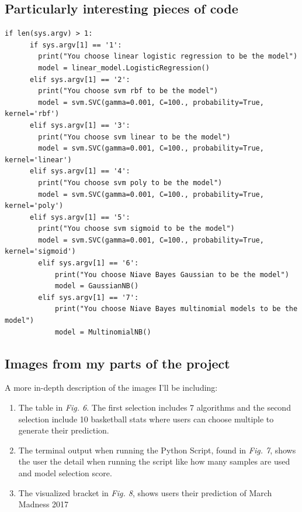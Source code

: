 \documentclass[onecolumn, draftclsnofoot,10pt, compsoc]{IEEEtran}
\begin{document}
\subsection{Particularly interesting pieces of code}
\begin{lstlisting}[caption=Python command line arguments that allow users to use different algorithmns from SciKit Learn, label=list2]
if len(sys.argv) > 1:
      if sys.argv[1] == '1':
        print("You choose linear logistic regression to be the model")
        model = linear_model.LogisticRegression()
      elif sys.argv[1] == '2':
        print("You choose svm rbf to be the model")
        model = svm.SVC(gamma=0.001, C=100., probability=True, kernel='rbf')
      elif sys.argv[1] == '3':
        print("You choose svm linear to be the model")
        model = svm.SVC(gamma=0.001, C=100., probability=True, kernel='linear')
      elif sys.argv[1] == '4':
        print("You choose svm poly to be the model")
        model = svm.SVC(gamma=0.001, C=100., probability=True, kernel='poly')
      elif sys.argv[1] == '5':
        print("You choose svm sigmoid to be the model")
        model = svm.SVC(gamma=0.001, C=100., probability=True, kernel='sigmoid')
        elif sys.argv[1] == '6':
            print("You choose Niave Bayes Gaussian to be the model")
            model = GaussianNB()
        elif sys.argv[1] == '7':
            print("You choose Niave Bayes multinomial models to be the model")
            model = MultinomialNB()
\end{lstlisting}

\subsection{Images from my parts of the project}
A more in-depth description of the images I'll be including:

\begin{enumerate}
\item The table in \textit{Fig. 6}. The first selection includes 7 algorithms and the second selection include 10 basketball stats where users can choose multiple to generate their prediction.
\item The terminal output when running the Python Script, found in \textit{Fig. 7}, shows the user the detail when running the script like how many samples are used and model selection score.
\item The visualized bracket in \textit{Fig. 8}, shows users their prediction of March Madness 2017
\end{enumerate}  
\end{document}
